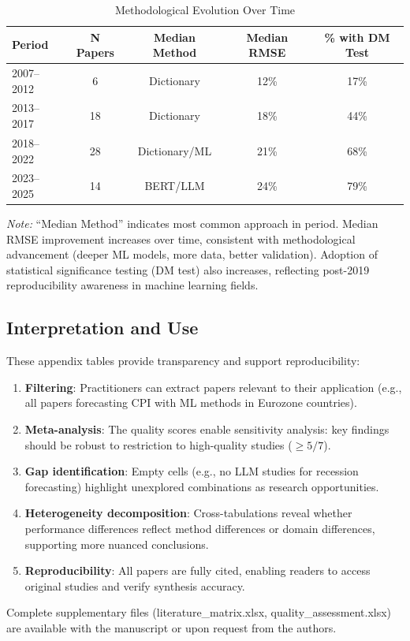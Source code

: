 \begin{table}[H]
\centering
\caption{Methodological Evolution Over Time}
\label{tab:evolution_time}
\small
\begin{tabular}{|l|c|c|c|c|}
\hline
\textbf{Period} & \textbf{N Papers} & \textbf{Median Method} & \textbf{Median RMSE} & \textbf{\% with DM Test} \\
\hline
2007--2012 & 6 & Dictionary & 12\% & 17\% \\
\hline
2013--2017 & 18 & Dictionary & 18\% & 44\% \\
\hline
2018--2022 & 28 & Dictionary/ML & 21\% & 68\% \\
\hline
2023--2025 & 14 & BERT/LLM & 24\% & 79\% \\
\hline
\end{tabular}
\raggedright\footnotesize
\textit{Note:} ``Median Method'' indicates most common approach in period. Median RMSE improvement increases over time, consistent with methodological advancement (deeper ML models, more data, better validation). Adoption of statistical significance testing (DM test) also increases, reflecting post-2019 reproducibility awareness in machine learning fields.
\end{table}

\vspace{2em}

\subsection*{Interpretation and Use}

These appendix tables provide transparency and support reproducibility:

\begin{enumerate}

\item \textbf{Filtering}: Practitioners can extract papers relevant to their application (e.g., all papers forecasting CPI with ML methods in Eurozone countries).

\item \textbf{Meta-analysis}: The quality scores enable sensitivity analysis: key findings should be robust to restriction to high-quality studies ($\geq 5/7$).

\item \textbf{Gap identification}: Empty cells (e.g., no LLM studies for recession forecasting) highlight unexplored combinations as research opportunities.

\item \textbf{Heterogeneity decomposition}: Cross-tabulations reveal whether performance differences reflect method differences or domain differences, supporting more nuanced conclusions.

\item \textbf{Reproducibility}: All papers are fully cited, enabling readers to access original studies and verify synthesis accuracy.

\end{enumerate}

Complete supplementary files (literature\_matrix.xlsx, quality\_assessment.xlsx) are available with the manuscript or upon request from the authors.

